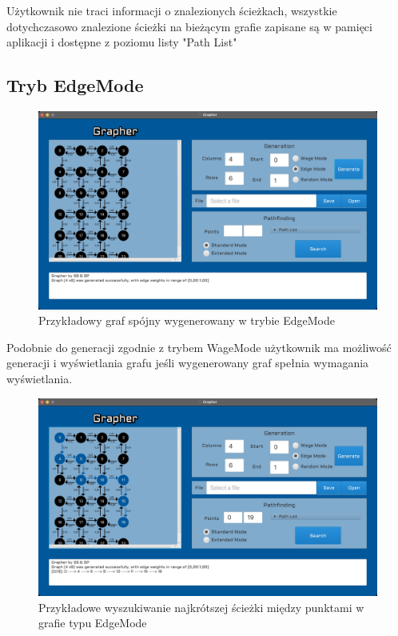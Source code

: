\documentclass[10pt, a4paper]{report}
\begin{document}
  Użytkownik nie traci informacji o znalezionych ścieżkach, wszystkie dotychczasowo znalezione ścieżki na bieżącym grafie zapisane są w pamięci aplikacji i dostępne z poziomu listy "Path List"
  \newpage

  \subsection{Tryb EdgeMode}

  \begin{figure}[h]
    \begin{center}
        \includegraphics[scale=0.165]{grapherEdgeModeGeneration.jpg}
        \caption{Przykładowy graf spójny wygenerowany w trybie EdgeMode}
    \end{center}
  \end{figure}

  Podobnie do generacji zgodnie z trybem WageMode użytkownik ma możliwość generacji i wyświetlania grafu jeśli wygenerowany graf spełnia wymagania wyświetlania.



  \begin{figure}[h]
    \begin{center}
        \includegraphics[scale=0.165]{grapherEdgeModePathFinding.jpg}
        \caption{Przykładowe wyszukiwanie najkrótszej ścieżki między punktami w grafie typu EdgeMode}
    \end{center}
  \end{figure}
\end{document}

